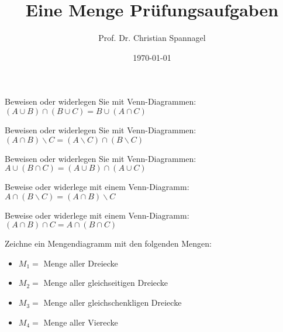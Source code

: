 \documentclass{cssheet}
\title{Eine Menge Prüfungsaufgaben}
\author{Prof. Dr. Christian Spannagel}
\date{\today}
\begin{document}
\printtitle

\begin{aufgabe}[WiSe 16/17]
	Beweisen oder widerlegen Sie mit Venn-Diagrammen:
	$
	(A \cup B) \cap(B \cup C)=B \cup(A \cap C)
	$
\end{aufgabe}

\begin{aufgabe}[SoSe 22]
	Beweisen oder widerlegen Sie mit Venn-Diagrammen:
	$
	(A \cap B) \backslash C=(A \backslash C) \cap(B \backslash C)
	$
\end{aufgabe}

\begin{aufgabe}[SoSe 23]
	Beweisen oder widerlegen Sie mit Venn-Diagrammen:
	$
	A \cup (B \cap C)=(A \cup B) \cap(A \cup C)
	$
\end{aufgabe}

\begin{aufgabe}[WiSe 23/24]
	Beweise oder widerlege mit einem Venn-Diagramm:
	$A \cap(B \backslash C)=(A \cap B) \backslash C$
\end{aufgabe}

\begin{aufgabe}[WiSe 24/25]
	Beweise oder widerlege mit einem Venn-Diagramm:
	$
	(A \cap B) \cap C=A \cap(B \cap C)
	$
\end{aufgabe}

\begin{aufgabe}
	Zeichne ein Mengendiagramm mit den folgenden Mengen:
	\begin{itemize}
		\item $M_1=$ Menge aller Dreiecke
		\item $M_2=$ Menge aller gleichseitigen Dreiecke
		\item $M_3=$ Menge aller gleichschenkligen Dreiecke
		\item $M_4=$ Menge aller Vierecke
	\end{itemize}
\end{aufgabe}


\vspace*{10mm}
\printlicense

\printsocials
\end{document}
